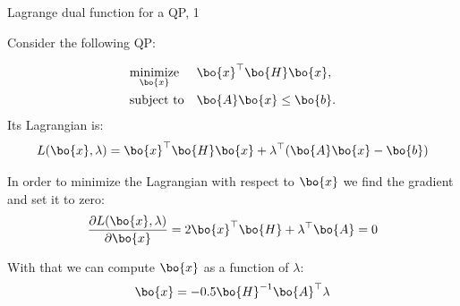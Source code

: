 \documentclass{beamer}
\begin{document}
\begin{frame}{Lagrange dual function for a QP, 1}
	\begin{flushleft}
		
		Consider the following QP:
		
		\begin{equation}
			\begin{aligned}
				& \underset{\bo{x}}{\text{minimize}}
				& & \bo{x}^\top \bo{H} \bo{x}, \\
				& \text{subject to}
				& & \bo{A}\bo{x} \leq \bo{b}.
			\end{aligned}
		\end{equation}
		Its Lagrangian is:
		\begin{equation}
			L(\bo{x}, \lambda) = \bo{x}^\top \bo{H} \bo{x} + \lambda^\top (\bo{A}\bo{x} - \bo{b})
		\end{equation}
		
		In order to minimize the Lagrangian with respect to $\bo{x}$ we find the gradient and set it to zero:
		\begin{equation}
			\frac{\partial L(\bo{x}, \lambda)}{\partial \bo{x}} = 2\bo{x}^\top \bo{H} + \lambda^\top \bo{A} = 0
		\end{equation}
		
		With that we can compute $\bo{x}$ as a function of $\lambda$:
		\begin{equation}
			\bo{x} = -0.5\bo{H}^{-1}\bo{A}^\top \lambda
		\end{equation}
		
	\end{flushleft}
\end{frame}
\end{document}
